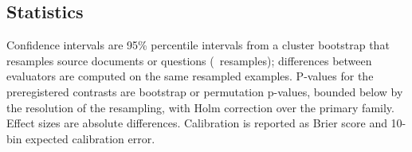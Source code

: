 \subsection{Statistics}

Confidence intervals are 95\% percentile intervals from a cluster bootstrap that resamples source documents or questions (\NBoot\ resamples); differences between evaluators are computed on the same resampled examples. P-values for the preregistered contrasts are bootstrap or permutation p-values, bounded below by the resolution of the resampling, with Holm correction over the primary family. Effect sizes are absolute differences. Calibration is reported as Brier score and 10-bin expected calibration error.
